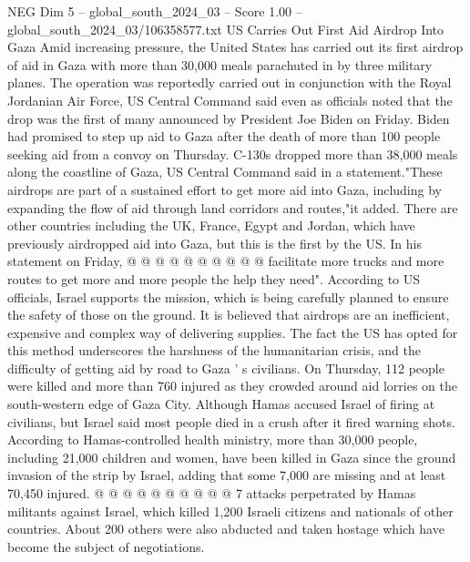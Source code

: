 \begin{textsample}{NEG Dim 5 – global\_south\_2024\_03 – Score 1.00 – global\_south\_2024\_03/106358577.txt}  \label{ex:f5_neg_319}
US Carries Out First Aid Airdrop Into Gaza Amid increasing pressure, the United States has carried out its first airdrop of aid in Gaza with more than 30,000 meals parachuted in by three military planes.
The operation was reportedly carried out in conjunction with the Royal Jordanian Air Force, US Central Command said even as officials noted that the drop was the first of many announced by President Joe Biden on Friday.
Biden had promised to step up aid to Gaza after the death of more than 100 people seeking aid from a convoy on Thursday.
C-130s dropped more than 38,000 meals along the coastline of Gaza, US Central Command said in a statement."These airdrops are part of a sustained effort to get more aid into Gaza, including by expanding the flow of aid through land corridors and routes,"it added.
There are other countries including the UK, France, Egypt and Jordan, which have previously airdropped aid into Gaza, but this is the first by the US.
In his statement on Friday, @ @ @ @ @ @ @ @ @ @ facilitate more trucks and more routes to get more and more people the help they need".
According to US officials, Israel supports the mission, which is being carefully planned to ensure the safety of those on the ground.
It is believed that airdrops are an inefficient, expensive and complex way of delivering supplies.
The fact the US has opted for this method underscores the harshness of the humanitarian crisis, and the difficulty of getting aid by road to Gaza ' s civilians.
On Thursday, 112 people were killed and more than 760 injured as they crowded around aid lorries on the south-western edge of Gaza City.
Although Hamas accused Israel of firing at civilians, but Israel said most people died in a crush after it fired warning shots.
According to Hamas-controlled health ministry, more than 30,000 people, including 21,000 children and women, have been killed in Gaza since the ground invasion of the strip by Israel, adding that some 7,000 are missing and at least 70,450 injured. @ @ @ @ @ @ @ @ @ @ 7 attacks perpetrated by Hamas militants against Israel, which killed 1,200 Israeli citizens and nationals of other countries.
About 200 others were also abducted and taken hostage which have become the subject of negotiations.

\end{textsample}
